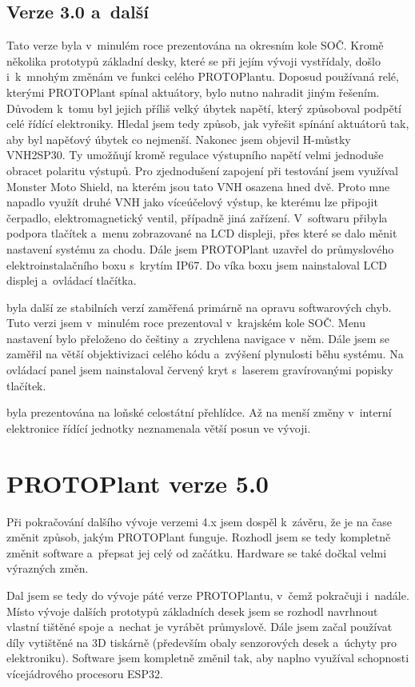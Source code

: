 \subsection{Verze 3.0 a~další}
Tato verze byla v~minulém roce prezentována na okresním kole SOČ.
Kromě několika prototypů základní desky, které se při jejím vývoji vystřídaly, došlo i~k~mnohým změnám ve funkci celého PROTOPlantu.
Doposud používaná relé, kterými PROTOPlant spínal aktuátory, bylo nutno nahradit jiným řešením.
Důvodem k~tomu byl jejich příliš velký úbytek napětí, který způsoboval podpětí celé řídící elektroniky.
Hledal jsem tedy způsob, jak vyřešit spínání aktuátorů tak, aby byl napěťový úbytek co nejmenší.
Nakonec jsem objevil H-můstky VNH2SP30. 
Ty umožňují kromě regulace výstupního napětí velmi jednoduše obracet polaritu výstupů.
Pro zjednodušení zapojení při testování jsem využíval Monster Moto Shield, na kterém jsou tato VNH osazena hned dvě.
Proto mne napadlo využít druhé VNH jako víceúčelový výstup, ke kterému lze připojit čerpadlo, elektromagnetický ventil, případně jiná zařízení.
V~softwaru přibyla podpora tlačítek a~menu zobrazované na LCD displeji, přes které se dalo měnit nastavení systému za chodu.
Dále jsem PROTOPlant uzavřel do průmyslového elektroinstalačního boxu s~krytím IP67.
Do víka boxu jsem nainstaloval LCD displej a~ovládací tlačítka.
\newline

\noindent{} byla další ze stabilních verzí zaměřená primárně na opravu softwarových chyb.
Tuto verzi jsem v~minulém roce prezentoval v~krajském kole SOČ.
Menu nastavení bylo přeloženo do češtiny a~zrychlena navigace v~něm.
Dále jsem se zaměřil na větší objektivizaci celého kódu a~zvýšení plynulosti běhu systému.
Na ovládací panel jsem nainstaloval červený kryt s~laserem gravírovanými popisky tlačítek.
\newline

\noindent{} byla prezentována na loňské celostátní přehlídce.
Až na menší změny v~interní elektronice řídící jednotky neznamenala větší posun ve vývoji.

\section{PROTOPlant verze 5.0}
Při pokračování dalšího vývoje verzemi 4.x jsem dospěl k~závěru, že je na čase změnit způsob, jakým PROTOPlant funguje.
Rozhodl jsem se tedy kompletně změnit software a~přepsat jej celý od začátku.
Hardware se také dočkal velmi výrazných změn.

Dal jsem se tedy do vývoje páté verze PROTOPlantu, v~čemž pokračuji i~nadále.
Místo vývoje dalších prototypů základních desek jsem se rozhodl navrhnout vlastní tištěné spoje a~nechat je vyrábět průmyslově.
Dále jsem začal používat díly vytištěné na 3D tiskárně (především obaly senzorových desek a~úchyty pro elektroniku).
Software jsem kompletně změnil tak, aby naplno využíval schopnosti vícejádrového procesoru ESP32.

\newpage